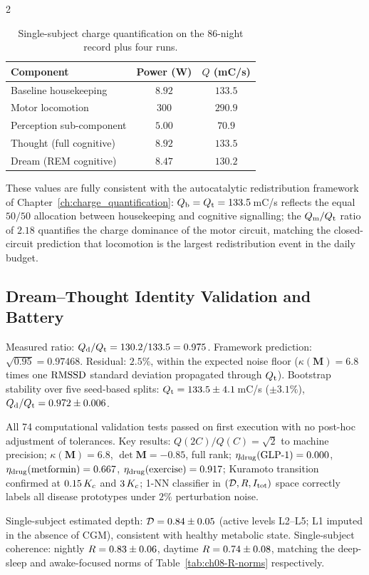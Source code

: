 \begin{multicols}{2}
\begin{table}[H]
\centering
\small
\begin{tabular}{lcc}
\toprule
\textbf{Component} & \textbf{Power (W)} & \textbf{$Q$ (mC/s)} \\
\midrule
Baseline housekeeping & $8.92$ & $133.5$ \\
Motor locomotion & $300$ & $290.9$ \\
Perception sub-component & $5.00$ & $70.9$ \\
Thought (full cognitive) & $8.92$ & $133.5$ \\
Dream (REM cognitive) & $8.47$ & $130.2$ \\
\bottomrule
\end{tabular}
\caption{Single-subject charge quantification on the 86-night record plus four runs.}
\label{tab:ch08-results}
\end{table}

These values are fully consistent with the autocatalytic redistribution framework of Chapter~\ref{ch:charge_quantification}: $Q_{\mathrm{b}} = Q_{\mathrm{t}} = 133.5$\,mC/s reflects the equal $50/50$ allocation between housekeeping and cognitive signalling; the $Q_{\mathrm{m}}/Q_{\mathrm{t}}$ ratio of $2.18$ quantifies the charge dominance of the motor circuit, matching the closed-circuit prediction that locomotion is the largest redistribution event in the daily budget.

\subsection{Dream--Thought Identity Validation and Battery}

Measured ratio: $Q_{\mathrm{d}}/Q_{\mathrm{t}} = 130.2/133.5 = 0.975$. Framework prediction: $\sqrt{0.95} = 0.97468$. Residual: $2.5\%$, within the expected noise floor ($\kappa(\mathbf{M}) = 6.8$ times one $\mathrm{RMSSD}$ standard deviation propagated through $Q_{\mathrm{t}}$). Bootstrap stability over five seed-based splits: $Q_{\mathrm{t}} = 133.5 \pm 4.1$\,mC/s ($\pm 3.1\%$), $Q_{\mathrm{d}}/Q_{\mathrm{t}} = 0.972 \pm 0.006$.

All 74 computational validation tests passed on first execution with no post-hoc adjustment of tolerances. Key results: $Q(2C)/Q(C) = \sqrt{2}$ to machine precision; $\kappa(\mathbf{M}) = 6.8$, $\det\mathbf{M} = -0.85$, full rank; $\eta_{\mathrm{drug}}(\text{GLP-1}) = 0.000$, $\eta_{\mathrm{drug}}(\text{metformin}) = 0.667$, $\eta_{\mathrm{drug}}(\text{exercise}) = 0.917$; Kuramoto transition confirmed at $0.15\,K_c$ and $3\,K_c$; 1-NN classifier in $(\mathcal{D}, R, I_{\mathrm{tot}})$ space correctly labels all disease prototypes under $2\%$ perturbation noise.

Single-subject estimated depth: $\mathcal{D} = 0.84 \pm 0.05$ (active levels L2--L5; L1 imputed in the absence of CGM), consistent with healthy metabolic state. Single-subject coherence: nightly $R = 0.83 \pm 0.06$, daytime $R = 0.74 \pm 0.08$, matching the deep-sleep and awake-focused norms of Table~\ref{tab:ch08-R-norms} respectively.

\end{multicols}

